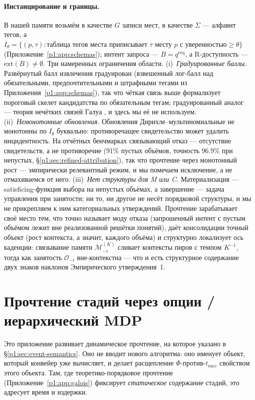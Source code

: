 \documentclass{article}
\begin{document}
\paragraph{Инстанцирование и границы.}
В нашей памяти возьмём в качестве $G$ записи мест, в качестве $\Sigma$ --- алфавит тегов, а $I_\theta = \{(p,\tau) : \text{таблица тегов места приписывает } \tau \text{ месту } p \text{ с уверенностью} \ge \theta\}$ (Приложение~\ref{p1:app:schemas}); интент запроса --- $B = q^{\mathrm{req}}$, а R-доступность --- $\mathrm{ext}(B) \ne \emptyset$. Три намеренных ограничения области. (i)~\emph{Градуированные баллы.} Развёрнутый балл извлечения градуирован (взвешенный лог-балл над обязательными, предпочтительными и штрафными тегами из Приложения~\ref{p1:app:schemas}), так что чёткая связь выше формализует пороговый скелет кандидатства по обязательным тегам; градуированный аналог --- теория нечётких связей Галуа \citep{belohlavek1999fuzzy}, и здесь мы её не используем. (ii)~\emph{Немонотонные обновления.} Обновления Дирихле--мультиномиальные не монотонны по $I_\theta$ буквально: противоречащее свидетельство может удалить инцидентность. На отчётных бенчмарках связывающий отказ --- отсутствие свидетельств, а не противоречие (91\% пустых объёмов, точность 96.9\% при непустых, \S\ref{p1:sec:refined-attribution}), так что прочтение через монотонный рост --- эмпирически релевантный режим, и мы помечаем исключение, а не отмахиваемся от него. (iii)~\emph{Нет структуры для M или C.} Материализация --- satisficing-функция выбора на непустых объёмах, а завершение --- задача управления при занятости; ни то, ни другое не несёт порядковой структуры, и мы не прикрепляем к ним категориальных утверждений. Прочтение зарабатывает своё место тем, что точно называет моду отказа (запрошенный интент с пустым объёмом лежит вне реализованной решётки понятий), даёт консолидации точный объект (рост контекста, а значит, каждого объёма) и структурно локализует ось каденции: связывание памяти $\mathcal{M}^{(K)}_{-i}$ сливает контексты пиров с темпом $K^{-1}$, тогда как занятость $\mathcal{O}_{-i}$ вне-контекстна --- что и есть структурное содержание двух знаков наклонов Эмпирического утверждения~1.

\section{Прочтение стадий через опции / иерархический MDP}
\label{p1:app:hmdp}

Это приложение развивает динамическое прочтение, на которое указано в
\S\ref{p1:sec:event-semantics}. Оно не вводит нового алгоритма: оно именует
объект, который конвейер уже вычисляет, и делает расщепление
$\Phi$-против-$t_{\mathrm{succ}}$ свойством этого объекта. Там, где
теоретико-порядковое прочтение (Приложение~\ref{p1:app:galois}) фиксирует \emph{статическое}
содержание стадий, это адресует время и издержки.
\end{document}
